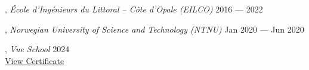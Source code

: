 , \textit{École d’Ingénieurs du Littoral – Côte d’Opale (EILCO)} \hfill 2016 --- 2022

, \textit{Norwegian University of Science and Technology (NTNU)} \hfill Jan 2020 --- Jun 2020

, \textit{Vue School} \hfill 2024 \\
\hspace*{1.5em}\small{\href{https://api.certificates.dev/certificates/9cfd1f5a-286f-4565-bc7c-8331c2c55d82/download?signature=4e37fd60f1cfe47ed69a05684eb956809c4ba754e2ea1205cef27db20957e2f8}{View Certificate}}
